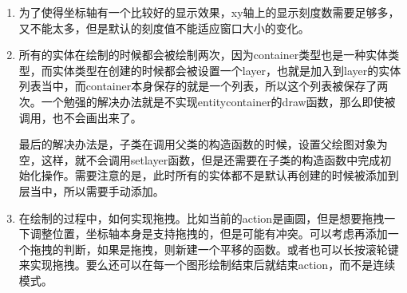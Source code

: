 \begin{enumerate}
	\item 为了使得坐标轴有一个比较好的显示效果，xy轴上的显示刻度数需要足够多，又不能太多，但是默认的刻度值不能适应窗口大小的变化。
	
	\item 所有的实体在绘制的时候都会被绘制两次，因为container类型也是一种实体类型，而实体类型在创建的时候都会被设置一个layer，也就是加入到layer的实体列表当中，而container本身保存的就是一个列表，所以这个列表被保存了两次。一个勉强的解决办法就是不实现entitycontainer的draw函数，那么即使被调用，也不会画出来了。
	
\hspace*{2em}最后的解决办法是，子类在调用父类的构造函数的时候，设置父绘图对象为空，这样，就不会调用setlayer函数，但是还需要在子类的构造函数中完成初始化操作。需要注意的是，此时所有的实体都不是默认再创建的时候被添加到层当中，所以需要手动添加。
	
	\item 在绘制的过程中，如何实现拖拽。比如当前的action是画圆，但是想要拖拽一下调整位置，坐标轴本身是支持拖拽的，但是可能有冲突。可以考虑再添加一个拖拽的判断，如果是拖拽，则新建一个平移的函数。或者也可以长按滚轮键来实现拖拽。要么还可以在每一个图形绘制结束后就结束action，而不是连续模式。
\end{enumerate}